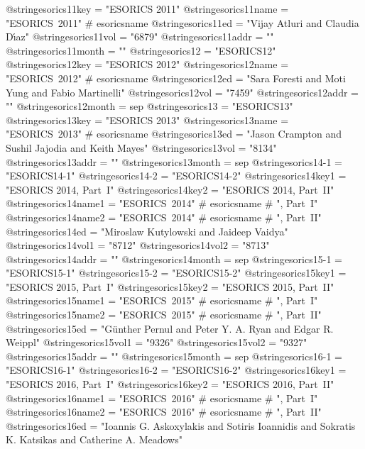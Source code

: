 @string{esorics11key =          "ESORICS 2011"}
@string{esorics11name =         "ESORICS~2011" # esoricsname}
@string{esorics11ed =           "Vijay Atluri and Claudia D\'{\i}az"}
@string{esorics11vol =          "6879"}
@string{esorics11addr =         ""}
@string{esorics11month =        ""}
@string{esorics12 =             "ESORICS12"}
@string{esorics12key =          "ESORICS 2012"}
@string{esorics12name =         "ESORICS~2012" # esoricsname}
@string{esorics12ed =           "Sara Foresti and Moti Yung and Fabio Martinelli"}
@string{esorics12vol =          "7459"}
@string{esorics12addr =         ""}
@string{esorics12month =        sep}
@string{esorics13 =             "ESORICS13"}
@string{esorics13key =          "ESORICS 2013"}
@string{esorics13name =         "ESORICS~2013" # esoricsname}
@string{esorics13ed =           "Jason Crampton and Sushil Jajodia and Keith Mayes"}
@string{esorics13vol =          "8134"}
@string{esorics13addr =         ""}
@string{esorics13month =        sep}
@string{esorics14-1 =           "ESORICS14-1"}
@string{esorics14-2 =           "ESORICS14-2"}
@string{esorics14key1 =         "ESORICS 2014, Part~I"}
@string{esorics14key2 =         "ESORICS 2014, Part~II"}
@string{esorics14name1 =        "ESORICS~2014" # esoricsname # ", Part~I"}
@string{esorics14name2 =        "ESORICS~2014" # esoricsname # ", Part~II"}
@string{esorics14ed =           "Miroslaw Kutylowski and Jaideep Vaidya"}
@string{esorics14vol1 =         "8712"}
@string{esorics14vol2 =         "8713"}
@string{esorics14addr =         ""}
@string{esorics14month =        sep}
@string{esorics15-1 =           "ESORICS15-1"}
@string{esorics15-2 =           "ESORICS15-2"}
@string{esorics15key1 =         "ESORICS 2015, Part~I"}
@string{esorics15key2 =         "ESORICS 2015, Part~II"}
@string{esorics15name1 =        "ESORICS~2015" # esoricsname # ", Part~I"}
@string{esorics15name2 =        "ESORICS~2015" # esoricsname # ", Part~II"}
@string{esorics15ed =           "G{\"u}nther Pernul and Peter Y. A. Ryan and Edgar R. Weippl"}
@string{esorics15vol1 =         "9326"}
@string{esorics15vol2 =         "9327"}
@string{esorics15addr =         ""}
@string{esorics15month =        sep}
@string{esorics16-1 =           "ESORICS16-1"}
@string{esorics16-2 =           "ESORICS16-2"}
@string{esorics16key1 =         "ESORICS 2016, Part~I"}
@string{esorics16key2 =         "ESORICS 2016, Part~II"}
@string{esorics16name1 =        "ESORICS~2016" # esoricsname # ", Part~I"}
@string{esorics16name2 =        "ESORICS~2016" # esoricsname # ", Part~II"}
@string{esorics16ed =           "Ioannis G. Askoxylakis and Sotiris Ioannidis and Sokratis K. Katsikas and Catherine A. Meadows"}
